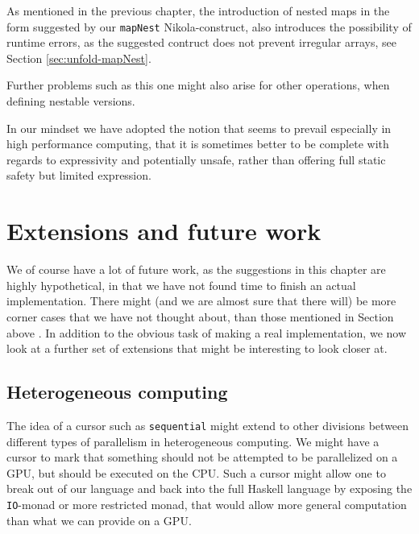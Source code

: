 As mentioned in the previous chapter, the introduction of nested maps
in the form suggested by our \lstinline{mapNest} Nikola-construct,
also introduces the possibility of runtime errors, as the suggested
contruct does not prevent irregular arrays, see Section \ref{sec:unfold-mapNest}.

Further problems such as this one might also arise for other
operations, when defining nestable versions.

In our mindset we have adopted the notion that seems to prevail especially in
high performance computing, that it is sometimes better to be complete with
regards to expressivity and potentially unsafe, rather than offering full
static safety but limited expression.



\section{Extensions and future work}
\label{sec:parallelism-future-work}

We of course have a lot of future work, as the suggestions in this
chapter are highly hypothetical, in that we have not found time to
finish an actual implementation. There might (and we are almost sure
that there will) be more corner cases that we have not thought about,
than those mentioned in Section \label{sec:sequential-complications}
above . In addition to the
obvious task of making a real implementation, we now look at a further
set of extensions that might be interesting to look closer at.

\subsection{Heterogeneous computing}
The idea of a cursor such as \lstinline{sequential} might extend to
other divisions between different types of parallelism in
heterogeneous computing. We might have a cursor to mark that something
should not be attempted to be parallelized on a GPU, but should be
executed on the CPU. Such a cursor might allow one to break out of our
language and back into the full Haskell language by exposing the
\lstinline{IO}-monad or more restricted monad, that would allow more
general computation than what we can provide on a GPU.

